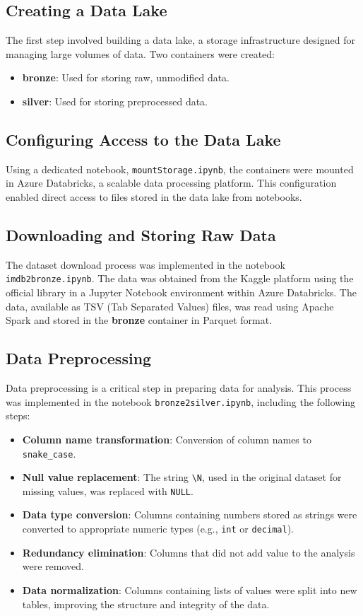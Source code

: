 \documentclass[a4paper,12pt]{article}
\begin{document}
\subsection{Creating a Data Lake}
The first step involved building a data lake, a storage infrastructure designed for managing large volumes of data. Two containers were created:
\begin{itemize}
    \item \textbf{bronze}: Used for storing raw, unmodified data.
    \item \textbf{silver}: Used for storing preprocessed data.
\end{itemize}

\subsection{Configuring Access to the Data Lake}
Using a dedicated notebook, \texttt{mountStorage.ipynb}, the containers were mounted in 
Azure Databricks, a scalable data processing platform. This configuration enabled direct 
access to files stored in the data lake from notebooks.

\subsection{Downloading and Storing Raw Data}
The dataset download process was implemented in the notebook \texttt{imdb2bronze.ipynb}. The data 
was obtained from the Kaggle platform using the official library in a Jupyter Notebook environment 
within Azure Databricks. The data, available as TSV (Tab Separated Values) files, was read using 
Apache Spark and stored in the \textbf{bronze} container in Parquet format.

\subsection{Data Preprocessing}
Data preprocessing is a critical step in preparing data for analysis. This process was implemented in the notebook \texttt{bronze2silver.ipynb}, including the following steps:

\begin{itemize}
    \item \textbf{Column name transformation}: Conversion of column names to \texttt{snake\_case}.
    \item \textbf{Null value replacement}: The string \texttt{\textbackslash N}, used in the original dataset for missing values, was replaced with \texttt{NULL}.
    \item \textbf{Data type conversion}: Columns containing numbers stored as strings were converted to appropriate numeric types (e.g., \texttt{int} or \texttt{decimal}).
    \item \textbf{Redundancy elimination}: Columns that did not add value to the analysis were removed.
    \item \textbf{Data normalization}: Columns containing lists of values were split into new tables, improving the structure and integrity of the data.
\end{itemize}
\end{document}
